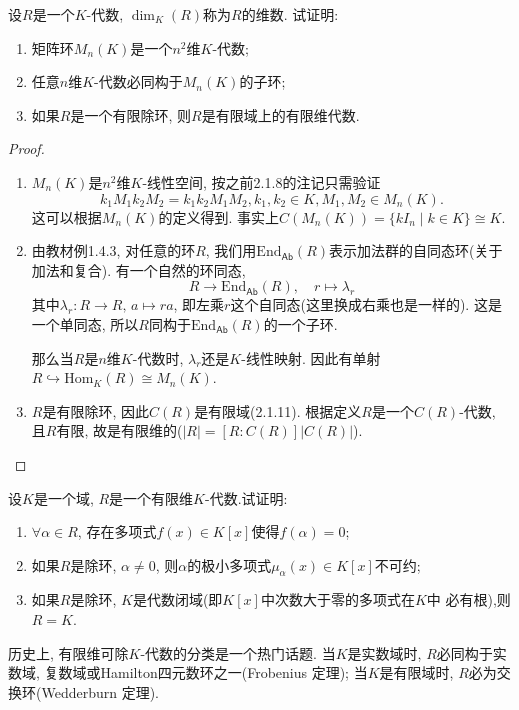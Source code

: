 \documentclass{../solutions-cn}
\begin{document}
\begin{exercise}[习题2.1.13]
    设$R$是一个$K$-代数, $\dim_K(R)$称为$R$的维数.
试证明: 
\begin{enumerate}[(1)]
    \item 矩阵环$M_n(K)$是一个$n^2$维$K$-代数;
    \item 任意$n$维$K$-代数必同构于$M_n(K)$的子环;
    \item 如果$R$是一个有限除环, 则$R$是有限域上的有限维代数.
\end{enumerate}
\end{exercise}

\begin{proof}
    \begin{enumerate}[(1)]
        \item $M_n(K)$是$n^2$维$K$-线性空间, 按之前2.1.8的注记只需验证
        \[
            k_1M_1k_2M_2 = k_1k_2M_1M_2, k_1, k_2 \in K, M_1, M_2 \in M_n(K).
        \]
        这可以根据$M_n(K)$的定义得到. 事实上$C(M_n(K)) = \{kI_n \mid k \in K\} \cong K$.
        \item 由教材例1.4.3, 对任意的环$R$, 我们用$\mathrm{End}_{\mathsf{Ab}}(R)$表示加法群的自同态环(关于加法和复合). 有一个自然的环同态,
        \[
            R \to \mathrm{End}_{\mathsf{Ab}}(R),\quad r \mapsto \lambda_r
        \]
        其中$\lambda_r: R \to R,\, a \mapsto ra$, 即左乘$r$这个自同态(这里换成右乘也是一样的). 这是一个单同态, 所以$R$同构于$\mathrm{End}_{\mathsf{Ab}}(R)$的一个子环.

        那么当$R$是$n$维$K$-代数时, $\lambda_r$还是$K$-线性映射. 因此有单射$R \hookrightarrow \mathrm{Hom}_K(R) \cong M_n(K)$.
        \item $R$是有限除环, 因此$C(R)$是有限域(2.1.11). 根据定义$R$是一个$C(R)$-代数, 且$R$有限, 故是有限维的($|R| = [R:C(R)]|C(R)|$).
    \end{enumerate}
\end{proof}

\begin{exercise}[习题2.1.14]
    设$K$是一个域, $R$是一个有限维$K$-代数.试证明: 
\begin{enumerate}[(1)]
    \item $\forall \alpha \in R$, 存在多项式$f(x) \in K[x]$使得$f(\alpha) = 0$;
    \item 如果$R$是除环, $\alpha \neq 0$, 则$\alpha$的极小多项式$\mu_\alpha(x) \in K[x]$不可约;
    \item 如果$R$是除环, $K$是代数闭域(即$K[x]$中次数大于零的多项式在$K$中
必有根),则$R = K$.
\end{enumerate}
历史上, 有限维可除$K$-代数的分类是一个热门话题. 当$K$是实数域时, $R$必同构于实数域,
复数域或Hamilton四元数环之一(Frobenius 定理);
当$K$是有限域时, $R$必为交换环(Wedderburn 定理).
\end{exercise}
\end{document}

